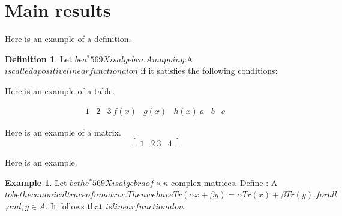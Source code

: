 \documentclass[12pt, reqno]{amsart}
\theoremstyle{definition}
\newtheorem{definition}[theorem]{Definition}
\newtheorem{example}[theorem]{Example}
\theoremstyle{remark}
\numberwithin{equation}{section}
\begin{document}
\section{Main results}

Here is an example of a definition. 

\begin{definition} Let $ be a ^*569Xisalgebra. A mapping
$\phi :A\rightarrow {} $ is
called a positive linear functional on $ if it satisfies the following conditions:

\end{definition}


Here is an example of a table.

\begin{table}[ht]
\caption{}\label{eqtable}
\renewcommand\arraystretch{1.5}
\noindent\[
\begin{array}{|c|c|c|}
\hline
1&2&3\
\hline f(x)&g(x)&h(x)\
\hline a&b&c\
\hline
\end{array}
\]
\end{table}

Here is an example of a matrix.
\begin{equation*}
\begin{bmatrix}
1 & 2 \
3 &  4
\end{bmatrix}
\end{equation*}


Here is an example.


\begin{example} Let $ be the ^*569Xisalgebra of \times n$ complex matrices. Define : A\rightarrow {}$ to be the canonical trace of a matrix. Then we have
\begin{equation}\label{2.1}
Tr(\alpha x+\beta y)=\alpha Tr(x)+\beta Tr(y).
\end{equation}
for all $\lambda ,\beta \in  \mathbb{C}$ and ,y\in A$. It follows that $ is linear functional on $.
\end{example}
\end{document}
